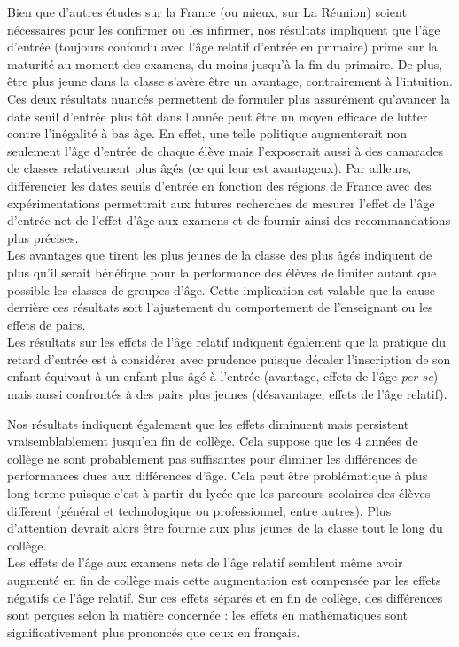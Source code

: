 \documentclass[
]{book}
\begin{document}
\quad Bien que d'autres études sur la France (ou mieux, sur La Réunion) soient nécessaires pour les confirmer ou les infirmer, nos résultats impliquent que l'âge d'entrée (toujours confondu avec l'âge relatif d'entrée en primaire) prime sur la maturité au moment des examens, du moins jusqu'à la fin du primaire. De plus, être plus jeune dans la classe s'avère être un avantage, contrairement à l'intuition. Ces deux résultats nuancés permettent de formuler plus assurément qu'avancer la date seuil d'entrée plus tôt dans l'année peut être un moyen efficace de lutter contre l'inégalité à bas âge. En effet, une telle politique augmenterait non seulement l'âge d'entrée de chaque élève mais l'exposerait aussi à des camarades de classes relativement plus âgés (ce qui leur est avantageux). Par ailleurs, différencier les dates seuils d'entrée en fonction des régions de France avec des expérimentations permettrait aux futures recherches de mesurer l'effet de l'âge d'entrée net de l'effet d'âge aux examens et de fournir ainsi des recommandations plus précises.\\
Les avantages que tirent les plus jeunes de la classe des plus âgés indiquent de plus qu'il serait bénéfique pour la performance des élèves de limiter autant que possible les classes de groupes d'âge. Cette implication est valable que la cause derrière ces résultats soit l'ajustement du comportement de l'enseignant ou les effets de pairs.\\
Les résultats sur les effets de l'âge relatif indiquent également que la pratique du retard d'entrée est à considérer avec prudence puisque décaler l'inscription de son enfant équivaut à un enfant plus âgé à l'entrée (avantage, effets de l'âge \emph{per se}) mais aussi confrontés à des pairs plus jeunes (désavantage, effets de l'âge relatif).

\quad Nos résultats indiquent également que les effets diminuent mais persistent vraisemblablement jusqu'en fin de collège. Cela suppose que les 4 années de collège ne sont probablement pas suffisantes pour éliminer les différences de performances dues aux différences d'âge. Cela peut être problématique à plus long terme puisque c'est à partir du lycée que les parcours scolaires des élèves diffèrent (général et technologique ou professionnel, entre autres). Plus d'attention devrait alors être fournie aux plus jeunes de la classe tout le long du collège.\\
Les effets de l'âge aux examens nets de l'âge relatif semblent même avoir augmenté en fin de collège mais cette augmentation est compensée par les effets négatifs de l'âge relatif. Sur ces effets séparés et en fin de collège, des différences sont perçues selon la matière concernée : les effets en mathématiques sont significativement plus prononcés que ceux en français.
\end{document}
